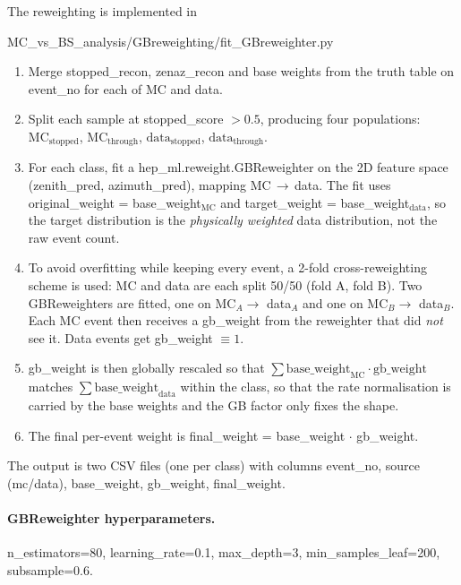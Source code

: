 \documentclass[11pt]{article}
\begin{document}
The reweighting is implemented in
\begin{center}
MC\_vs\_BS\_analysis/GBreweighting/fit\_GBreweighter.py
\end{center}

\begin{enumerate}
    \item Merge stopped\_recon, zenaz\_recon and base
          weights from the truth table on event\_no for each of
          MC and data.
    \item Split each sample at stopped\_score $> 0.5$, producing
          four populations: $\text{MC}_{\text{stopped}}$,
          $\text{MC}_{\text{through}}$, $\text{data}_{\text{stopped}}$,
          $\text{data}_{\text{through}}$.
    \item For each class, fit a hep\_ml.reweight.GBReweighter on
          the 2D feature space (zenith\_pred, azimuth\_pred),
          mapping MC\,$\to$\,data. The fit uses
          original\_weight = base\_weight$_\text{MC}$ and
          target\_weight = base\_weight$_\text{data}$, so the
          target distribution is the \emph{physically weighted} data
          distribution, not the raw event count.
    \item To avoid overfitting while keeping every event, a 2\nobreakdash-fold
          cross\nobreakdash-reweighting scheme is used: MC and data are each split
          50/50 (fold A, fold B). Two GBReweighters are fitted, one on
          MC$_A \to$ data$_A$ and one on MC$_B \to$ data$_B$. Each MC event
          then receives a gb\_weight from the reweighter that did
          \emph{not} see it. Data events get
          gb\_weight $\equiv 1$.
    \item gb\_weight is then globally rescaled so that
          $\sum \mathrm{base\_weight}_{\mathrm{MC}} \cdot \mathrm{gb\_weight}$
          matches $\sum \mathrm{base\_weight}_{\mathrm{data}}$ within the
          class, so that the rate normalisation is carried by the base
          weights and the GB factor only fixes the shape.
    \item The final per\nobreakdash-event weight is
          final\_weight = base\_weight $\cdot$ gb\_weight.
\end{enumerate}

The output is two CSV files (one per class) with columns
event\_no, source (mc/data),
base\_weight, gb\_weight, final\_weight.

\paragraph{GBReweighter hyperparameters.}
n\_estimators=80, learning\_rate=0.1,
max\_depth=3, min\_samples\_leaf=200,
subsample=0.6.
\end{document}
